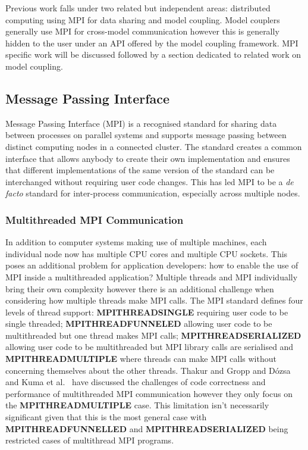 \documentclass{acm_proc_article-sp}
\renewcommand{\_}{\underscore\hspace{0pt}}
\begin{document}
Previous work falls under two related but independent areas: distributed
computing using MPI for data sharing and model coupling. Model couplers
generally use MPI for cross-model communication however this is generally hidden
to the user under an API offered by the model coupling framework. MPI specific
work will be discussed followed by a section dedicated to related work on model
coupling.

\subsection*{Message Passing Interface}

Message Passing Interface (MPI) is a recognised standard for sharing data
between processes on parallel systems and supports message passing between
distinct computing nodes in a connected cluster. The standard creates a common
interface that allows anybody to create their own implementation and ensures
that different implementations of the same version of the standard can be
interchanged without requiring user code changes. This has led MPI to be a
\textit{de facto} standard for inter-process communication, especially across
multiple nodes.

\subsubsection*{Multithreaded MPI Communication}

In addition to computer systems making use of multiple machines, each individual
node now has multiple CPU cores and multiple CPU sockets. This poses an
additional problem for application developers: how to enable the use of MPI
inside a multithreaded application? Multiple threads and MPI individually bring
their own complexity however there is an additional challenge when considering
how multiple threads make MPI calls. The MPI standard defines four levels of
thread support: \textbf{MPI\_THREAD\_SINGLE} requiring user code to be single
threaded; \textbf{MPI\_THREAD\_FUNNELED} allowing user code to be multithreaded
but one thread makes MPI calls; \textbf{MPI\_THREAD\_SERIALIZED} allowing user
code to be multithreaded but MPI library calls are serialised and
\textbf{MPI\_THREAD\_MULTIPLE} where threads can make MPI calls without
concerning themselves about the other threads. Thakur and Gropp
\cite{Thakur2009} and D\'{o}zsa and Kuma et al.\ \cite{Kumar} have discussed the
challenges of code correctness and performance of multithreaded MPI
communication however they only focus on the \textbf{MPI\_THREAD\_MULTIPLE}
case. This limitation isn't necessarily significant given that this is the most
general case with \textbf{MPI\_THREAD\_FUNNELLED} and
\textbf{MPI\_THREAD\_SERIALIZED} being restricted cases of multithread MPI
programs.
\end{document}
